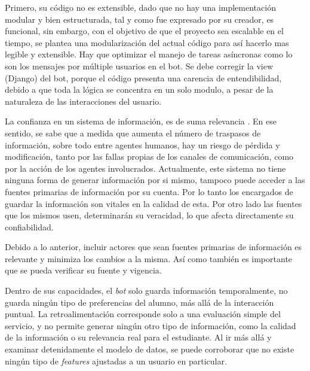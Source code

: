 \documentclass[guia]{upropuesta}
\begin{document}
    \par Primero, su código no es extensible, dado que no hay una implementación modular y bien estructurada, tal y como fue expresado por su creador, es funcional, sin embargo, con el objetivo de que el proyecto sea escalable en el tiempo, se plantea una modularización del actual código para así hacerlo mas legible y extensible. Hay que optimizar el manejo de tareas asíncronas como lo son los mensajes por múltiple usuarios en el bot. Se debe corregir la view (Django) del bot,  porque el código presenta una carencia de entendibilidad, debido a que toda la lógica se concentra en un solo modulo, a pesar de la naturaleza de las interacciones del usuario.
    \par La confianza en un sistema de información, es de suma relevancia \cite{Marsh2003}. En ese sentido, se sabe que a medida que aumenta el número de traspasos de información, sobre todo entre agentes humanos, hay un riesgo de pérdida y modificación, tanto por las fallas propias de los canales de comunicación, como por la acción de los agentes involucrados. Actualmente, este sistema no tiene ninguna forma de generar información por si mismo, tampoco puede acceder a las fuentes primarias de información por su cuenta. Por lo tanto los encargados de guardar la información son vitales en la calidad de esta. Por otro lado las fuentes que los mismos usen, determinarán su veracidad, lo que afecta directamente su confiabilidad.
    
    \par Debido a lo anterior, incluir actores que sean fuentes primarias de información es relevante y minimiza los cambios a la misma. Así como también es importante que se pueda verificar su fuente y vigencia.
    
     \par Dentro de sus capacidades, el \textit{bot} solo guarda información temporalmente, no guarda ningún tipo de preferencias del alumno, más allá de la interacción puntual. La retroalimentación corresponde solo a una evaluación simple del servicio, y no permite generar ningún otro tipo de información, como la calidad de la información o su relevancia real para el estudiante. Al ir más allá y examinar detenidamente el modelo de datos, se puede corroborar que no existe ningún tipo de \textit{features} ajustadas a un usuario en particular.
     
\end{document}
